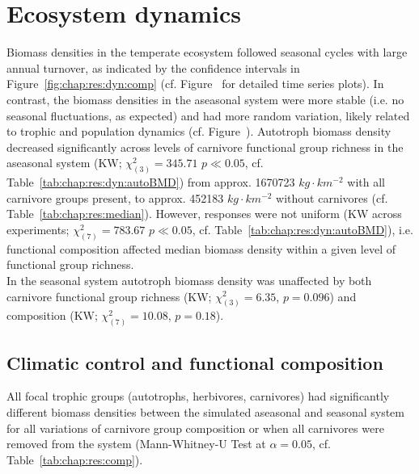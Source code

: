 \section{Ecosystem dynamics}
\label{chap:res:dyn} 
Biomass densities in the temperate ecosystem followed seasonal cycles with large annual turnover, as indicated by the confidence intervals in Figure~\ref{fig:chap:res:dyn:comp} (cf. Figure~ for detailed time series plots). In contrast, the biomass densities in the aseasonal system were more stable (i.e. no seasonal fluctuations, as expected) and had more random variation, likely related to trophic and population dynamics (cf. Figure~).
Autotroph biomass density decreased significantly across levels of carnivore functional group richness in the aseasonal system (KW; $\chi^{2}_{(3)} = 345.71$ $p \ll 0.05$, cf. Table~\ref{tab:chap:res:dyn:autoBMD}) from approx. 1670723 $kg\cdot km^{-2}$ with all carnivore groups present, to approx. 452183 $kg\cdot km^{-2}$ without carnivores (cf. Table~\ref{tab:chap:res:median}). 
However, responses were not uniform (KW across experiments; $\chi^{2}_{(7)} = 783.67$ $p \ll 0.05$, cf. Table~\ref{tab:chap:res:dyn:autoBMD}), i.e. functional composition affected median biomass density within a given level of functional group richness. \\
In the seasonal system autotroph biomass density was unaffected by both carnivore functional group richness (KW; $\chi^{2}_{(3)} = 6.35$, $p = 0.096$) and composition (KW; $\chi^{2}_{(7)} = 10.08$, $p = 0.18$).



\subsection{Climatic control and functional composition}
\label{chap:res:diff}
All focal trophic groups (autotrophs, herbivores, carnivores) had significantly different biomass densities between the simulated aseasonal and seasonal system for all variations of carnivore group composition or when all carnivores were removed from the system (Mann-Whitney-U Test at $\alpha = 0.05$, cf. Table~\ref{tab:chap:res:comp}).\\\\

